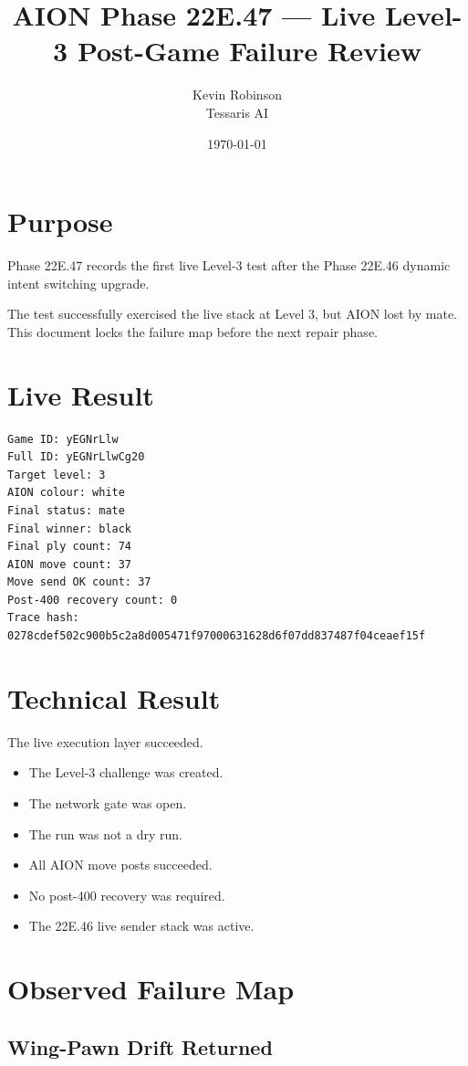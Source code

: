 \documentclass[11pt,a4paper]{article}
\title{\textbf{AION Phase 22E.47 --- Live Level-3 Post-Game Failure Review}}
\author{Kevin Robinson\\Tessaris AI}
\date{\today}
\begin{document}
\maketitle

\section{Purpose}

Phase 22E.47 records the first live Level-3 test after the Phase 22E.46 dynamic intent switching upgrade.

The test successfully exercised the live stack at Level 3, but AION lost by mate. This document locks the failure map before the next repair phase.

\section{Live Result}

\begin{verbatim}
Game ID: yEGNrLlw
Full ID: yEGNrLlwCg20
Target level: 3
AION colour: white
Final status: mate
Final winner: black
Final ply count: 74
AION move count: 37
Move send OK count: 37
Post-400 recovery count: 0
Trace hash: 0278cdef502c900b5c2a8d005471f97000631628d6f07dd837487f04ceaef15f
\end{verbatim}

\section{Technical Result}

The live execution layer succeeded.

\begin{itemize}
  \item The Level-3 challenge was created.
  \item The network gate was open.
  \item The run was not a dry run.
  \item All AION move posts succeeded.
  \item No post-400 recovery was required.
  \item The 22E.46 live sender stack was active.
\end{itemize}

\section{Observed Failure Map}

\subsection{Wing-Pawn Drift Returned}
\end{document}
